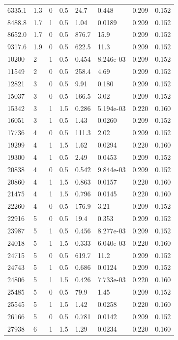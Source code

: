 \documentclass[preview]{standalone}
\begin{document}
{{\begin{tabular}{L{1.2cm}C{1.2cm} C{0.3cm}C{0.5cm} C{1.4cm}C{1.4cm} C{1.4cm}C{1.4cm}}
  6335.1  &   1.3  & 0     & 0.5 &  24.7  & 0.448  & 0.209 &  0.152   \\ 
  8488.8  &   1.7  & 1     & 0.5 &  1.04  & 0.0189  & 0.209 &  0.152   \\ 
  8652.0  &   1.7  & 0     & 0.5 &  876.7  & 15.9  & 0.209 &  0.152   \\ 
  9317.6  &   1.9  & 0     & 0.5 &  622.5  & 11.3  & 0.209 &  0.152   \\ 
  10200  &     2  & 1     & 0.5 &  0.454  & 8.246e-03  & 0.209 &  0.152   \\ 
  11549  &     2  & 0     & 0.5 &  258.4  & 4.69  & 0.209 &  0.152   \\ 
  12821  &     3  & 0     & 0.5 &  9.91  & 0.180  & 0.209 &  0.152   \\ 
  15037  &     3  & 0     & 0.5 &  166.5  & 3.02  & 0.209 &  0.152   \\ 
  15342  &     3  & 1     & 1.5 &  0.286  & 5.194e-03  & 0.220 &  0.160   \\ 
  16051  &     3  & 1     & 0.5 &  1.43  & 0.0260  & 0.209 &  0.152   \\ 
  17736  &     4  & 0     & 0.5 &  111.3  & 2.02  & 0.209 &  0.152   \\ 
  19299  &     4  & 1     & 1.5 &  1.62  & 0.0294  & 0.220 &  0.160   \\ 
  19300  &     4  & 1     & 0.5 &  2.49  & 0.0453  & 0.209 &  0.152   \\ 
  20838  &     4  & 0     & 0.5 &  0.542  & 9.844e-03  & 0.209 &  0.152   \\ 
  20860  &     4  & 1     & 1.5 &  0.863  & 0.0157  & 0.220 &  0.160   \\ 
  21475  &     4  & 1     & 1.5 &  0.796  & 0.0145  & 0.220 &  0.160   \\ 
  22260  &     4  & 0     & 0.5 &  176.9  & 3.21  & 0.209 &  0.152   \\ 
  22916  &     5  & 0     & 0.5 &  19.4  & 0.353  & 0.209 &  0.152   \\ 
  23987  &     5  & 1     & 0.5 &  0.456  & 8.277e-03  & 0.209 &  0.152   \\ 
  24018  &     5  & 1     & 1.5 &  0.333  & 6.040e-03  & 0.220 &  0.160   \\ 
  24715  &     5  & 0     & 0.5 &  619.7  & 11.2  & 0.209 &  0.152   \\ 
  24743  &     5  & 1     & 0.5 &  0.686  & 0.0124  & 0.209 &  0.152   \\ 
  24806  &     5  & 1     & 1.5 &  0.426  & 7.733e-03  & 0.220 &  0.160   \\ 
  25485  &     5  & 0     & 0.5 &  79.9  & 1.45  & 0.209 &  0.152   \\ 
  25545  &     5  & 1     & 1.5 &  1.42  & 0.0258  & 0.220 &  0.160   \\ 
  26166  &     5  & 0     & 0.5 &  0.781  & 0.0142  & 0.209 &  0.152   \\ 
  27938  &     6  & 1     & 1.5 &  1.29  & 0.0234  & 0.220 &  0.160   \\ 
\hline 
\end{tabular} 

}}
\end{document}

